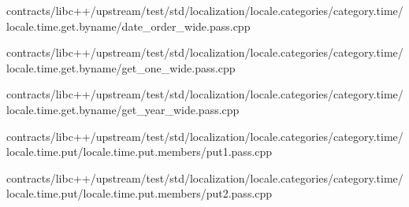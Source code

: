 \begin{DoxyCompactItemize}
contracts/libc++/upstream/test/std/localization/locale.\+categories/category.\+time/locale.\+time.\+get.\+byname/date\+\_\+order\+\_\+wide.\+pass.\+cpp\item 
contracts/libc++/upstream/test/std/localization/locale.\+categories/category.\+time/locale.\+time.\+get.\+byname/get\+\_\+one\+\_\+wide.\+pass.\+cpp\item 
contracts/libc++/upstream/test/std/localization/locale.\+categories/category.\+time/locale.\+time.\+get.\+byname/get\+\_\+year\+\_\+wide.\+pass.\+cpp\item 
contracts/libc++/upstream/test/std/localization/locale.\+categories/category.\+time/locale.\+time.\+put/locale.\+time.\+put.\+members/put1.\+pass.\+cpp\item 
contracts/libc++/upstream/test/std/localization/locale.\+categories/category.\+time/locale.\+time.\+put/locale.\+time.\+put.\+members/put2.\+pass.\+cpp\end{DoxyCompactItemize}
